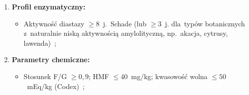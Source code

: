 \begin{enumerate}
    \item \textbf{Profil enzymatyczny:}
    \begin{itemize}
        \item Aktywność diastazy $\geq 8$~j.~Schade (lub $\geq 3$~j.
              dla~typów botanicznych z~naturalnie niską aktywnością
              amylolityczną, np.~akacja, cytrusy, lawenda)~\cite{codex_stan12};
    \end{itemize}
    \item \textbf{Parametry chemiczne:}
    \begin{itemize}
        \item Stosunek F/G $\geq 0{,}9$; HMF $\leq 40$~mg/kg;
              kwasowość wolna $\leq 50$~mEq/kg (Codex)~\cite{codex_stan12};
    \end{itemize}
\end{enumerate}


